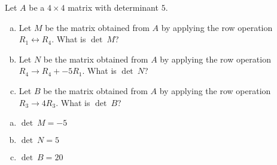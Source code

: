 
\begin{exerciseStatement}


Let \(A\) be a \(4 \times 4\) matrix with determinant \( 5 \).


\begin{enumerate}[(a)]
\item Let \(M\) be the matrix obtained from \(A\) by applying the row operation \( R_1 \leftrightarrow R_4 \). What is \(\operatorname{det}\ M\)?
\item Let \(N\) be the matrix obtained from \(A\) by applying the row operation \( R_4 \to R_4 + -5R_1 \). What is \(\operatorname{det}\ N\)?
\item Let \(B\) be the matrix obtained from \(A\) by applying the row operation \( R_3 \to 4R_3 \). What is \(\operatorname{det}\ B\)?
\end{enumerate}
    
\end{exerciseStatement}
    
\begin{exerciseAnswer} 

\begin{enumerate}[(a)]
\item \(\operatorname{det}\ M= -5 \)
\item \(\operatorname{det}\ N= 5 \)
\item \(\operatorname{det}\ B= 20 \)
\end{enumerate}
    
\end{exerciseAnswer}
    
